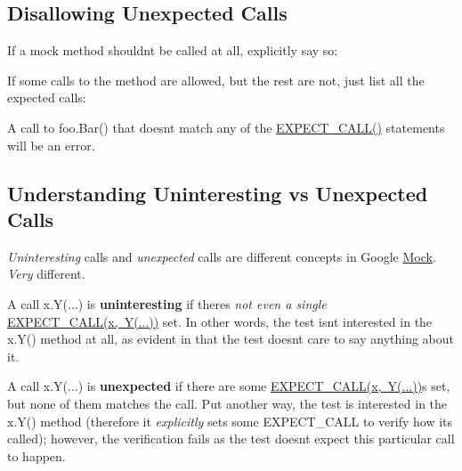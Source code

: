 \subsection*{Disallowing Unexpected Calls}

If a mock method shouldn\textquotesingle{}t be called at all, explicitly say so\+:


\begin{DoxyCode}{0}
\end{DoxyCode}


If some calls to the method are allowed, but the rest are not, just list all the expected calls\+:


\begin{DoxyCode}{0}
\end{DoxyCode}


A call to {\ttfamily foo.\+Bar()} that doesn\textquotesingle{}t match any of the {\ttfamily \mbox{\hyperlink{gmock-spec-builders_8h_a535a6156de72c1a2e25a127e38ee5232}{E\+X\+P\+E\+C\+T\+\_\+\+C\+A\+L\+L()}}} statements will be an error.

\subsection*{Understanding Uninteresting vs Unexpected Calls}

{\itshape Uninteresting} calls and {\itshape unexpected} calls are different concepts in Google \mbox{\hyperlink{classMock}{Mock}}. {\itshape Very} different.

A call {\ttfamily x.\+Y(...)} is {\bfseries{uninteresting}} if there\textquotesingle{}s {\itshape not even a single} {\ttfamily \mbox{\hyperlink{gmock-spec-builders_8h_a535a6156de72c1a2e25a127e38ee5232}{E\+X\+P\+E\+C\+T\+\_\+\+C\+A\+L\+L(x, Y(...))}}} set. In other words, the test isn\textquotesingle{}t interested in the {\ttfamily x.\+Y()} method at all, as evident in that the test doesn\textquotesingle{}t care to say anything about it.

A call {\ttfamily x.\+Y(...)} is {\bfseries{unexpected}} if there are some {\ttfamily \mbox{\hyperlink{gmock-spec-builders_8h_a535a6156de72c1a2e25a127e38ee5232}{E\+X\+P\+E\+C\+T\+\_\+\+C\+A\+L\+L(x, Y(...))}}s} set, but none of them matches the call. Put another way, the test is interested in the {\ttfamily x.\+Y()} method (therefore it {\itshape explicitly} sets some {\ttfamily E\+X\+P\+E\+C\+T\+\_\+\+C\+A\+LL} to verify how it\textquotesingle{}s called); however, the verification fails as the test doesn\textquotesingle{}t expect this particular call to happen.

